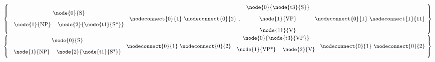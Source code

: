 



\vspace*{2ex}
$\left \{
\mbox{
\begin{tabular}{cc}
\multicolumn{2}{c}{\node{0}{S}} \\[2ex]
\node{1}{NP} & \node{2}{\node{t1}{S*}}
\end{tabular}
\nodeconnect{0}{1} \nodeconnect{0}{2}
}
,
\mbox{
\begin{tabular}{c}
\node{0}{\node{t3}{S}} \\[2ex]
\node{1}{VP} \\[2ex]
\node{11}{V}
\end{tabular}
\nodeconnect{0}{1} \nodeconnect{1}{11}   
}
\right \}$
{\makedash{2pt}
}
% 
% 
$\left \{
\mbox{
\begin{tabular}{cc}
\multicolumn{2}{c}{\node{0}{S}} \\[2ex]
\node{1}{NP} & \node{2}{\node{t1}{S*}}
\end{tabular}
\nodeconnect{0}{1} \nodeconnect{0}{2}
\hspace{-1em}
}
,
\mbox{
\begin{tabular}{ccc}
\multicolumn{2}{c}{\node{0}{\node{t3}{VP}}} \\[2ex]
\node{1}{VP*} & \node{2}{V} \\[2ex]
\end{tabular}
\nodeconnect{0}{1} \nodeconnect{0}{2}
}
\right \}$
{\makedash{2pt}
}


